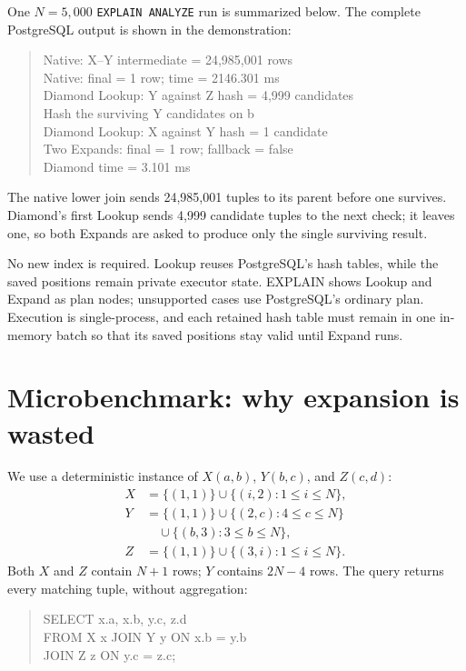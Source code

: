 \documentclass[10pt,twocolumn]{article}
\newcommand{\code}[1]{{\small\texttt{#1}}}
\begin{document}
One $N=5{,}000$ \code{EXPLAIN ANALYZE} run is summarized below. The
complete PostgreSQL output is shown in the demonstration:
\begin{quote}\footnotesize\ttfamily\raggedright
Native: X--Y intermediate = 24,985,001 rows\\
Native: final = 1 row; time = 2146.301 ms\\[2pt]
Diamond Lookup: Y against Z hash = 4,999 candidates\\
Hash the surviving Y candidates on b\\
Diamond Lookup: X against Y hash = 1 candidate\\
Two Expands: final = 1 row; fallback = false\\
Diamond time = 3.101 ms
\end{quote}
The native lower join sends 24,985,001 tuples to its parent before one survives.
Diamond's first Lookup sends 4,999 candidate tuples to the next check; it leaves
one, so both Expands are asked to produce only the single surviving result.

No new index is required. Lookup reuses PostgreSQL's hash tables, while the
saved positions remain private executor state. EXPLAIN shows Lookup and Expand
as plan nodes; unsupported cases use PostgreSQL's ordinary plan. Execution is
single-process, and each retained hash table must remain in one in-memory batch
so that its saved positions stay valid until Expand runs.

\section{Microbenchmark: why expansion is wasted}
We use a deterministic instance of $X(a,b)$, $Y(b,c)$, and $Z(c,d)$:
\begin{align*}
X &= \{(1,1)\}\cup\{(i,2):1\leq i\leq N\},\\
Y &= \{(1,1)\}\cup\{(2,c):4\leq c\leq N\}\\
  &\quad\cup\{(b,3):3\leq b\leq N\},\\
Z &= \{(1,1)\}\cup\{(3,i):1\leq i\leq N\}.
\end{align*}
Both $X$ and $Z$ contain $N+1$ rows; $Y$ contains $2N-4$ rows.
The query returns every matching tuple, without aggregation:
\begin{quote}\small\ttfamily
SELECT x.a, x.b, y.c, z.d\\
FROM X x JOIN Y y ON x.b = y.b\\
JOIN Z z ON y.c = z.c;
\end{quote}
\end{document}
